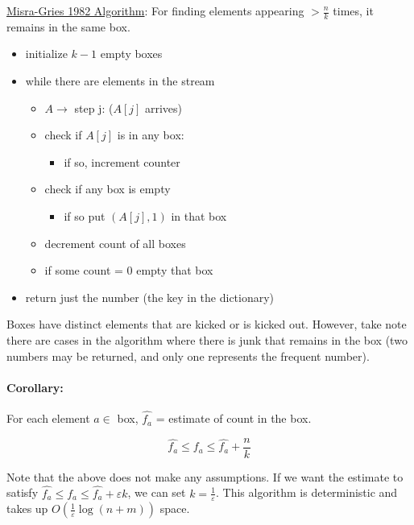 \documentclass[11pt]{article}
\begin{document}
\begin{mdframed}[backgroundcolor=blue!05,topline=false,bottomline=false,leftline=false,rightline=false] 
	\underline{\sc Misra-Gries 1982 Algorithm}:
	For finding elements appearing $> \frac{n}{k}$ times, it remains in the same box.
	\begin{itemize}
		\item initialize $k-1$ empty boxes
		\item while there are elements in the stream
		\begin{itemize}
    			\item $A \rightarrow$ step j: ($A[j]$ arrives)
    				\item check if $A[j]$ is in any box:
    				\begin{itemize}
    					\item if so, increment counter
    				\end{itemize}
    			\item check if any box is empty
    				\begin{itemize}
    					\item if so put $(A[j], 1)$ in that box
    				\end{itemize}
    			\item decrement count of all boxes
			\item if some count = 0 empty that box
		\end{itemize}
		\item return just the number (the key in the dictionary)
	\end{itemize}
\end{mdframed}

Boxes have distinct elements that are kicked or is kicked out. However, take note there are cases in the algorithm where there is junk that remains in the box (two numbers may be returned, and only one represents the frequent number). 

\paragraph{Corollary:} For each element $a \in$ box, $\hat{f_a}$ = estimate of count in the box.

\[ \hat{f_a} \leq f_a \leq \hat{f_a} + \frac{n}{k} \]

Note that the above does not make any assumptions. If we want the estimate to satisfy $\hat{f_a} \leq f_a \leq \hat{f_a} + \varepsilon k$, we can set $k = \frac{1}{\varepsilon}$. This algorithm is deterministic and takes up $O(\frac{1}{\varepsilon} \log(n + m))$ space.
\end{document}
